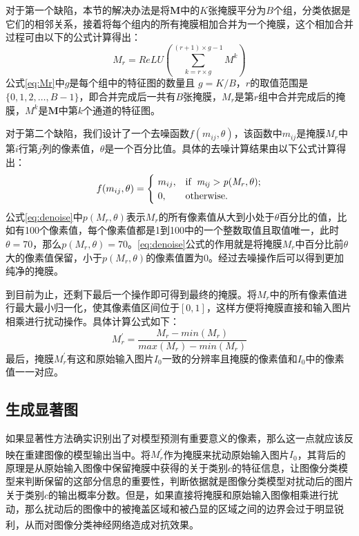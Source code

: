对于第一个缺陷，本节的解决办法是将$\boldsymbol{M}$中的$K$张掩膜平分为$B$个组，分类依据是它们的相邻关系，接着将每个组内的所有掩膜相加合并为一个掩膜，这个相加合并过程可由以下的公式计算得出：
\begin{equation}
	M_r=ReLU(\sum_{k=r\times g}^{(r+1)\times g-1}{M^k})
	\label{eq:Mr}
\end{equation}
公式\ref{eq:Mr}中$g$是每个组中的特征图的数量且 $g=K/B$，$r$的取值范围是$\{0,1,2,\dots,B-1\}$，即合并完成后一共有$B$张掩膜，$M_r$是第$r$组中合并完成后的掩膜，$M^k$是$\boldsymbol{M}$中第$k$个通道的特征图。

对于第二个缺陷，我们设计了一个去噪函数$f(m_{ij},\theta)$，该函数中$m_{ij}$是掩膜$M_r$中第$i$行第$j$列的像素值，$\theta$是一个百分比值。具体的去噪计算结果由以下公式计算得出：
\begin{equation}
	f(m_{ij},\theta)= \begin{cases}
		\ m_{ij}, & \rm if \enspace \it m_{ij}>p(M_r,\theta) ; \\
		\ 0, & \rm otherwise .\\
	\end{cases}
\label{eq:denoise}
\end{equation}
公式\ref{eq:denoise}中$p(M_r,\theta)$表示$M_r$的所有像素值从大到小处于$\theta$百分比的值，比如有100个像素值，每个像素值都是1到100中的一个整数取值且取值唯一，此时$\theta =70$，那么$p(M_r,\theta)=70$。\ref{eq:denoise}公式的作用就是将掩膜$M_r$中百分比前$\theta$大的像素值保留，小于$p(M_r,\theta)$的像素值置为0。经过去噪操作后可以得到更加纯净的掩膜。

到目前为止，还剩下最后一个操作即可得到最终的掩膜。将$M_r$中的所有像素值进行最大最小归一化，使其像素值区间位于$[0,1]$，这样方便将掩膜直接和输入图片相乘进行扰动操作。具体计算公式如下：
\begin{equation}
	M^{\prime}_r=\frac{M_r-min(M_r)}{max(M_r)-min(M_r)}\label{e_minmax}
\end{equation}
最后，掩膜$M^{\prime}_r$有这和原始输入图片$I_0$一致的分辨率且掩膜的像素值和$I_0$中的像素值一一对应。

\subsection{生成显著图}
如果显著性方法确实识别出了对模型预测有重要意义的像素，那么这一点就应该反映在重建图像的模型输出当中\textsuperscript{\cite{kapishnikov2019xrai}}。将$M^{\prime}_r$作为掩膜来扰动原始输入图片$I_0$，其背后的原理是从原始输入图像中保留掩膜中获得的关于类别$c$的特征信息，让图像分类模型来判断保留的这部分信息的重要性，判断依据就是图像分类模型对扰动后的图片关于类别$c$的输出概率分数。但是，如果直接将掩膜和原始输入图像相乘进行扰动，那么扰动后的图像中的被掩盖区域和被凸显的区域之间的边界会过于明显锐利，从而对图像分类神经网络造成对抗效果\textsuperscript{\cite{dabkowski2017real}}。

